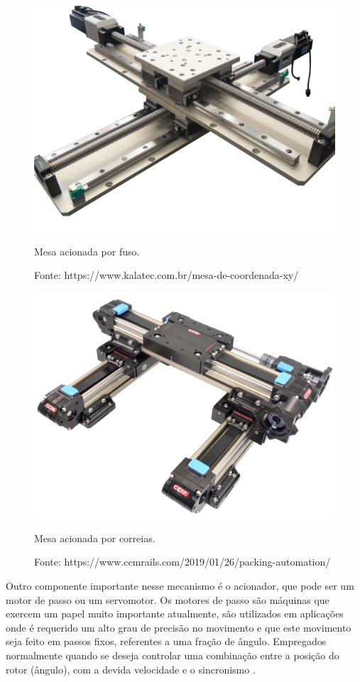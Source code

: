\begin{figure}[H]
\centering
\includegraphics[scale = 0.3]{figuras/mfuso}
\caption{Mesa acionada por fuso.}
\caption*{Fonte: https://www.kalatec.com.br/mesa-de-coordenada-xy/}
\label{fig:mfuso}
\end{figure}

\begin{figure}[H]
\centering
\includegraphics[scale = 0.065]{figuras/mcorreia}
\caption{Mesa acionada por correias.}
\caption*{Fonte: https://www.ccmrails.com/2019/01/26/packing-automation/}
\label{fig:mcorreia}
\end{figure}
    
Outro componente importante nesse mecanismo é o acionador, que pode ser um motor de passo ou um servomotor. 
Os motores de passo são máquinas que exercem um papel muito importante atualmente, são utilizados em 
aplicações onde é requerido um alto grau de precisão no movimento e que este movimento seja feito em passos 
fixos, referentes a uma fração de ângulo. Empregados normalmente quando se deseja controlar uma combinação 
entre a posição do rotor (ângulo), com a devida velocidade e o sincronismo \cite{silva2018maquinas}.


